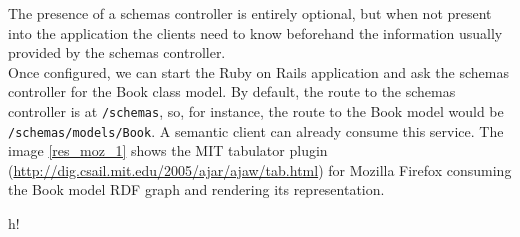 The presence of a schemas controller is entirely optional, but when not present into the application the clients need
to know beforehand the information usually provided by the schemas controller.\\

Once configured, we can start the Ruby on Rails application and ask the schemas controller for the Book class model. By
default, the route to the schemas controller is at \texttt{/schemas}, so, for instance, the route to the Book model would
be \texttt{/schemas/models/Book}. A semantic client can already consume this service. The image \ref{res_moz_1} shows
the MIT tabulator plugin (\url{http://dig.csail.mit.edu/2005/ajar/ajaw/tab.html}) for Mozilla Firefox consuming the Book model RDF graph and rendering its representation.

\begin{table}{h!}
\noindent{}
\caption{The defined Book model RDF graph served from the schemas controller}
\end{table}


